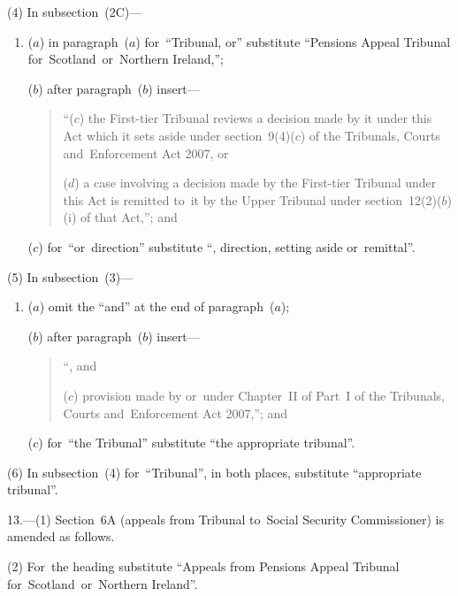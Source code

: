 \documentclass[12pt,a4paper]{article}
\begin{document}
(4) In subsection~(2C)—
\begin{enumerate}\item[]
($a$) in paragraph~($a$)  for~“Tribunal, or” substitute “Pensions Appeal Tribunal for~Scotland~or~Northern Ireland,”;

($b$) after paragraph~($b$)  insert—
\begin{quotation}
“($c$) the First-tier Tribunal reviews a decision made by it under this Act which it sets aside under section~9(4)($c$)  of the Tribunals, Courts and~Enforcement Act 2007, or

($d$) a case involving a decision made by the First-tier Tribunal under this Act is remitted to~it by the Upper Tribunal under section~12(2)($b$)(i)  of that Act,”; and
\end{quotation}

($c$) for~“or~direction” substitute “, direction, setting aside or~remittal”.
\end{enumerate}

(5) In subsection~(3)—
\begin{enumerate}\item[]
($a$) omit the “and” at the end of paragraph~($a$);

($b$) after paragraph~($b$)  insert—
\begin{quotation}
“, and

($c$) provision made by or~under Chapter~II of Part~I of the Tribunals, Courts and~Enforcement Act 2007,”; and
\end{quotation}

($c$) for~“the Tribunal” substitute “the appropriate tribunal”.
\end{enumerate}

(6) In subsection~(4) for~“Tribunal”, in both places, substitute “appropriate tribunal”.

\medskip

13.---(1)  Section~6A (appeals from Tribunal to~Social Security Commissioner) is amended as follows.

(2) For~the heading substitute “Appeals from Pensions Appeal Tribunal for~Scotland~or~Northern Ireland”.
\end{document}
